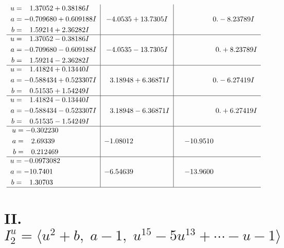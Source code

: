 \documentclass[1p]{elsarticle_modified}
\theoremstyle{definition}
\begin{document}
$$\begin{array}{c|c|c}
\begin{aligned}
u &= \phantom{-}1.37052 + 0.38186 I \\
a &= -0.709680 + 0.609188 I \\
b &= \phantom{-}1.59214 + 2.36282 I\end{aligned}
 & -4.0535 + 13.7305 I & \phantom{-0.000000 } 0. - 8.23789 I \\ \hline\begin{aligned}
u &= \phantom{-}1.37052 - 0.38186 I \\
a &= -0.709680 - 0.609188 I \\
b &= \phantom{-}1.59214 - 2.36282 I\end{aligned}
 & -4.0535 - 13.7305 I & \phantom{-0.000000 -}0. + 8.23789 I \\ \hline\begin{aligned}
u &= \phantom{-}1.41824 + 0.13440 I \\
a &= -0.588434 + 0.523307 I \\
b &= \phantom{-}0.51535 + 1.54249 I\end{aligned}
 & \phantom{-}3.18948 + 6.36871 I & \phantom{-0.000000 } 0. - 6.27419 I \\ \hline\begin{aligned}
u &= \phantom{-}1.41824 - 0.13440 I \\
a &= -0.588434 - 0.523307 I \\
b &= \phantom{-}0.51535 - 1.54249 I\end{aligned}
 & \phantom{-}3.18948 - 6.36871 I & \phantom{-0.000000 -}0. + 6.27419 I \\ \hline\begin{aligned}
u &= -0.302230\phantom{ +0.000000I} \\
a &= \phantom{-}2.69339\phantom{ +0.000000I} \\
b &= \phantom{-}0.212469\phantom{ +0.000000I}\end{aligned}
 & -1.08012\phantom{ +0.000000I} & -10.9510\phantom{ +0.000000I} \\ \hline\begin{aligned}
u &= -0.0973082\phantom{ +0.000000I} \\
a &= -10.7401\phantom{ +0.000000I} \\
b &= \phantom{-}1.30703\phantom{ +0.000000I}\end{aligned}
 & -6.54639\phantom{ +0.000000I} & -13.9600\phantom{ +0.000000I}\\
 \hline 
 \end{array}$$\newpage\newpage\renewcommand{\arraystretch}{1}
\centering \section*{II. $I^u_{2}= \langle u^2+b,\;a-1,\;u^{15}-5 u^{13}+\cdots- u-1 \rangle$}
\end{document}
